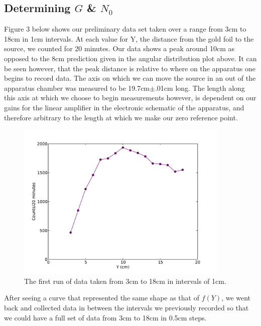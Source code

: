 \subsection{Determining $G$ \& $N_0$}
Figure 3 below shows our preliminary data set taken over a range from 3cm to 18cm in 1cm intervals. At each value for Y, the distance from the gold foil to the source, we counted for 20 minutes. Our data shows a peak around 10cm as opposed to the 8cm prediction given in the angular distribution plot above. It can be seen however, that the peak distance is relative to where on the apparatus one begins to record data. The axis on which we can move the source in an out of the apparatus chamber was measured to be 19.7cm$\pm$.01cm long. The length along this axis at which we choose to begin measurements however, is dependent on our gains for the linear amplifier in the electronic schematic of the apparatus, and therefore arbitrary to the length at which we make our zero reference point. 
\begin{figure}[H]
\begin{center}
\includegraphics[width=4in]{firstrun.pdf}
\caption{The first run of data taken from 3cm to 18cm in intervals of 1cm.}
\end{center}
\end{figure}
After seeing a curve that represented the same shape as that of $f(Y)$, we went back and collected data in between the intervals we previously recorded so that we could have a full set of data from 3cm to 18cm in 0.5cm steps. 
